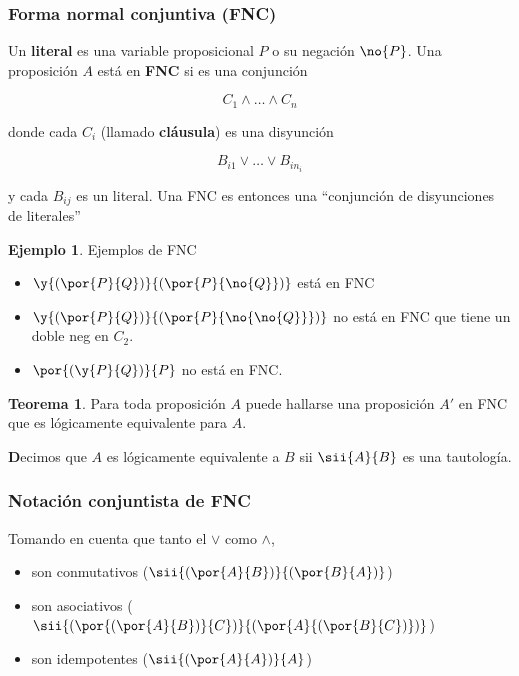 \documentclass{report}
\theoremstyle{definition} %
\newtheorem{theorem}{Teorema}[chapter]
\newtheorem*{example*}{Ejemplo}
\newenvironment{nota}[1]
    {\begin{leftbar}\textbf{#1}}
    {\end{leftbar}}
\begin{document}
\subsubsection{Forma normal conjuntiva (FNC)}\label{sec:logico-prop-fnc}

Un \textbf{literal} es una variable proposicional $P$ o su negación $\no{P}$.
Una proposición $A$ está en \textbf{FNC} si es una conjunción

\[
    C_1 \wedge \dots \wedge C_n
\]

donde cada $C_i$ (llamado \textbf{cláusula}) es una disyunción

\[
    B_{i1} \vee \dots \vee B_{in_i}
\]

y cada $B_{ij}$ es un literal. Una FNC es entonces una ``conjunción de
disyunciones de literales''

\begin{example*}Ejemplos de FNC
    \begin{itemize}
        \item $\y{(\por{P}{Q})}{(\por{P}{\no{Q}})}$ está en FNC
        \item $\y{(\por{P}{Q})}{(\por{P}{\no{\no{Q}}})}$ no está en FNC que
        tiene un doble neg en $C_2$.
        \item $\por{(\y{P}{Q})}{P}$ no está en FNC.
    \end{itemize}
\end{example*}

\begin{theorem}
    Para toda proposición $A$ puede hallarse una proposición $A'$ en FNC que es
    lógicamente equivalente para $A$.
\end{theorem}

\begin{nota}
    Decimos que $A$ es lógicamente equivalente a $B$ sii $\sii{A}{B}$ es una
    tautología.
\end{nota}

\subsubsection{Notación conjuntista de FNC}

Tomando en cuenta que tanto el $\vee$ como $\wedge$,

\begin{itemize}
    \item son conmutativos ($\sii{(\por{A}{B})}{(\por{B}{A})}$)
    \item son asociativos
    ($\sii{(\por{(\por{A}{B})}{C})}{(\por{A}{(\por{B}{C})})}$)
    \item son idempotentes ($\sii{(\por{A}{A})}{A}$)
\end{itemize}
\end{document}
